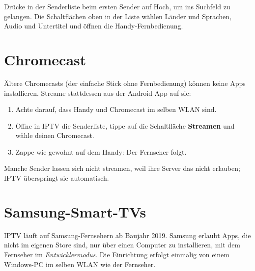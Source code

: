 Drücke in der Senderliste beim ersten Sender auf Hoch, um ins Suchfeld zu
gelangen. Die Schaltflächen oben in der Liste wählen Länder und Sprachen,
Audio und Untertitel und öffnen die Handy-Fernbedienung.


\section{Chromecast}
\label{sec:chromecast}

Ältere Chromecasts (der einfache Stick ohne Fernbedienung) können keine Apps
installieren. Streame stattdessen aus der Android-App auf sie:
\begin{enumerate}
  \item Achte darauf, dass Handy und Chromecast im selben WLAN sind.
  \item Öffne in IPTV die Senderliste, tippe auf die Schaltfläche
        \textbf{Streamen} und wähle deinen Chromecast.
  \item Zappe wie gewohnt auf dem Handy: Der Fernseher folgt.
\end{enumerate}
Manche Sender lassen sich nicht streamen, weil ihre Server das nicht
erlauben; IPTV überspringt sie automatisch.

\section{Samsung-Smart-TVs}

IPTV läuft auf Samsung-Fernsehern ab Baujahr 2019. Samsung erlaubt Apps, die
nicht im eigenen Store sind, nur über einen Computer zu installieren, mit
dem Fernseher im \emph{Entwicklermodus}. Die Einrichtung erfolgt einmalig
von einem Windows-PC im selben WLAN wie der Fernseher.

